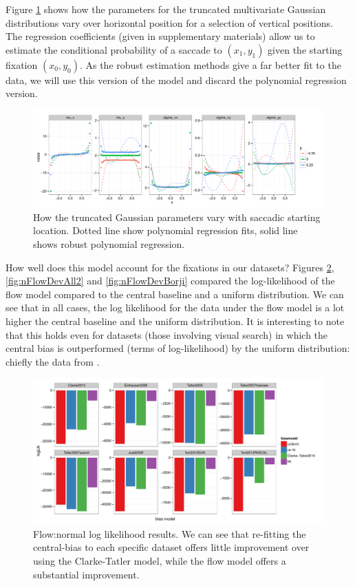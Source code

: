 Figure \ref{fig:nParamsOverSpace} shows how the parameters for the truncated multivariate Gaussian distributions vary over horizontal position for a selection of vertical positions. The regression coefficients (given in supplementary materials) allow us to estimate the conditional probability of a saccade to $(x_1, y_1)$ given the starting fixation $(x_0, y_0)$. As the robust estimation methods give a far better fit to the data, we will use this version of the model and discard the polynomial regression version.

\begin{figure}
\centering
\includegraphics[width=16cm]{../scripts/flow/figs/NparamsChagingOverSpace_ALL_tN}
\caption{How the truncated Gaussian parameters vary with saccadic starting location. Dotted line show polynomial regression fits, solid line shows robust polynomial regression.}
\label{fig:nParamsOverSpace}
\end{figure}


How well does this model account for the fixations in our datasets? Figures \ref{fig:nFlowDevAll}, \ref{fig:nFlowDevAll2} and \ref{fig:nFlowDevBorji} compared the log-likelihood of the flow model compared to the \cite{clarke-tatler2014} central baseline and a uniform distribution. We can see that in all cases, the log likelihood for the data under the flow model is a lot higher the central baseline and the uniform distribution. It is interesting to note that this holds even for datasets (those involving visual search) in which the central bias is outperformed (terms of log-likelihood) by the uniform distribution: chiefly the data from \cite{clarke2009,asher2013,tatler2007}. 



\begin{figure}
\centering
 \includegraphics[width=12cm]{../scripts/flow/figs/llh_training.pdf}
\caption{Flow:normal log likelihood results. We can see that re-fitting the central-bias to each specific dataset offers little improvement over using the Clarke-Tatler model, while the flow model offers a substantial improvement.}
\label{fig:nFlowDevAll}
\end{figure}

